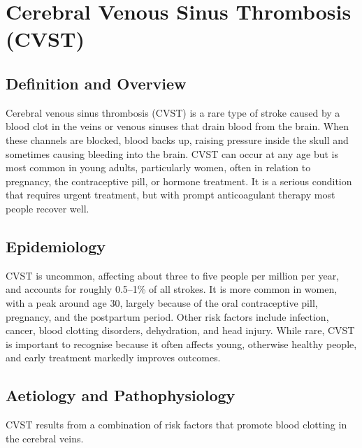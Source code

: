 \chapter{Cerebral Venous Sinus Thrombosis (CVST)}

\section*{Definition and Overview}
Cerebral venous sinus thrombosis (CVST) is a rare type of stroke caused by a blood clot in the veins or venous sinuses that drain blood from the brain. When these channels are blocked, blood backs up, raising pressure inside the skull and sometimes causing bleeding into the brain. CVST can occur at any age but is most common in young adults, particularly women, often in relation to pregnancy, the contraceptive pill, or hormone treatment. It is a serious condition that requires urgent treatment, but with prompt anticoagulant therapy most people recover well.

\section*{Epidemiology}
CVST is uncommon, affecting about three to five people per million per year, and accounts for roughly 0.5--1\% of all strokes. It is more common in women, with a peak around age 30, largely because of the oral contraceptive pill, pregnancy, and the postpartum period. Other risk factors include infection, cancer, blood clotting disorders, dehydration, and head injury. While rare, CVST is important to recognise because it often affects young, otherwise healthy people, and early treatment markedly improves outcomes.

\section*{Aetiology and Pathophysiology}
CVST results from a combination of risk factors that promote blood clotting in the cerebral veins.

